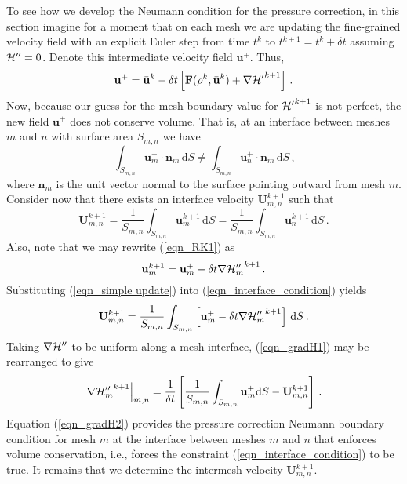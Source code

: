 \documentclass[11pt]{book}
\begin{document}
To see how we develop the Neumann condition for the pressure correction, in this section imagine for a moment that on each mesh we are updating the fine-grained velocity field with an explicit Euler step from time $t^k$ to $t^{k+1} = t^k + \delta t$ assuming ${\cal H}'' = 0$.  Denote this intermediate velocity field $\mathbf{u}^+$.  Thus,
\begin{equation}
\label{eqn_intermediate_vel}
\mathbf{u}^+ = \bar{\mathbf{u}}^k - \delta t \left[ \mathbf{F}(\rho^k,\bar{\mathbf{u}}^k) + \nabla{{\cal H}'}^{k+1} \right] \,\mbox{.}
\end{equation}
Now, because our guess for the mesh boundary value for ${{\cal H}'}^{k+1}$ is not perfect, the new field $\mathbf{u}^+$ does not conserve volume.  That is, at an interface between meshes $m$ and $n$ with surface area $S_{m,n}$ we have
\begin{equation}
\label{eqn_novolcons}
\int_{S_{m,n}} \mathbf{u}^+_{m} \cdot\mathbf{n}_m\,\mbox{d}S \ne \int_{S_{m,n}} \mathbf{u}^+_{n} \cdot\mathbf{n}_m\,\mbox{d}S \,\mbox{,}
\end{equation}
where $\mathbf{n}_m$ is the unit vector normal to the surface pointing outward from mesh $m$. Consider now that there exists an interface velocity $\mathbf{U}^{k+1}_{m,n}$ such that
\begin{equation}
\label{eqn_interface_condition}
\mathbf{U}^{k+1}_{m,n} = \frac{1}{S_{m,n}}\int_{S_{m,n}} \mathbf{u}^{k+1}_{m} \,\mbox{d} S = \frac{1}{S_{m,n}}\int_{S_{m,n}} \mathbf{u}^{k+1}_{n} \,\mbox{d} S \,\mbox{.}
\end{equation}
Also, note that we may rewrite (\ref{eqn_RK1}) as
\begin{equation}
\label{eqn_simple update}
\mathbf{u}_{m}^{k+1} = \mathbf{u}_{m}^+ - \delta t \nabla {{\cal H}_m''}^{k+1} \,\mbox{.}
\end{equation}
Substituting (\ref{eqn_simple update}) into (\ref{eqn_interface_condition}) yields
\begin{equation}
\label{eqn_gradH1}
\mathbf{U}^{k+1}_{m,n} = \frac{1}{S_{m,n}}\int_{S_{m,n}} \left[\mathbf{u}_{m}^+ - \delta t \nabla {{\cal H}_m''}^{k+1} \right]\,\mbox{d} S \,\mbox{.}
\end{equation}
Taking $\nabla {{\cal H}''}$ to be uniform along a mesh interface, (\ref{eqn_gradH1}) may be rearranged to give
\begin{equation}
\label{eqn_gradH2}
\left.\nabla {{\cal H}_m''}^{k+1}\right|_{m,n} = \frac{1}{\delta t} \left[ \frac{1}{S_{m,n}} \int_{S_{m,n}} \mathbf{u}_{m}^+ \mbox{d} S - \mathbf{U}^{k+1}_{m,n} \right] \,\mbox{.}
\end{equation}
Equation (\ref{eqn_gradH2}) provides the pressure correction Neumann boundary condition for mesh $m$ at the interface between meshes $m$ and $n$ that enforces volume conservation, i.e., forces the constraint (\ref{eqn_interface_condition}) to be true.  It remains that we determine the intermesh velocity $\mathbf{U}^{k+1}_{m,n}$.
\end{document}
